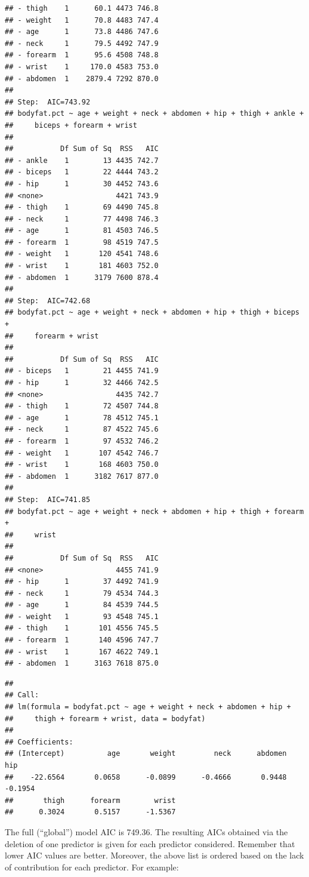 \documentclass[
]{book}
\begin{document}
\begin{verbatim}
## - thigh    1      60.1 4473 746.8
## - weight   1      70.8 4483 747.4
## - age      1      73.8 4486 747.6
## - neck     1      79.5 4492 747.9
## - forearm  1      95.6 4508 748.8
## - wrist    1     170.0 4583 753.0
## - abdomen  1    2879.4 7292 870.0
## 
## Step:  AIC=743.92
## bodyfat.pct ~ age + weight + neck + abdomen + hip + thigh + ankle + 
##     biceps + forearm + wrist
## 
##           Df Sum of Sq  RSS   AIC
## - ankle    1        13 4435 742.7
## - biceps   1        22 4444 743.2
## - hip      1        30 4452 743.6
## <none>                 4421 743.9
## - thigh    1        69 4490 745.8
## - neck     1        77 4498 746.3
## - age      1        81 4503 746.5
## - forearm  1        98 4519 747.5
## - weight   1       120 4541 748.6
## - wrist    1       181 4603 752.0
## - abdomen  1      3179 7600 878.4
## 
## Step:  AIC=742.68
## bodyfat.pct ~ age + weight + neck + abdomen + hip + thigh + biceps + 
##     forearm + wrist
## 
##           Df Sum of Sq  RSS   AIC
## - biceps   1        21 4455 741.9
## - hip      1        32 4466 742.5
## <none>                 4435 742.7
## - thigh    1        72 4507 744.8
## - age      1        78 4512 745.1
## - neck     1        87 4522 745.6
## - forearm  1        97 4532 746.2
## - weight   1       107 4542 746.7
## - wrist    1       168 4603 750.0
## - abdomen  1      3182 7617 877.0
## 
## Step:  AIC=741.85
## bodyfat.pct ~ age + weight + neck + abdomen + hip + thigh + forearm + 
##     wrist
## 
##           Df Sum of Sq  RSS   AIC
## <none>                 4455 741.9
## - hip      1        37 4492 741.9
## - neck     1        79 4534 744.3
## - age      1        84 4539 744.5
## - weight   1        93 4548 745.1
## - thigh    1       101 4556 745.5
## - forearm  1       140 4596 747.7
## - wrist    1       167 4622 749.1
## - abdomen  1      3163 7618 875.0
\end{verbatim}

\begin{verbatim}
## 
## Call:
## lm(formula = bodyfat.pct ~ age + weight + neck + abdomen + hip + 
##     thigh + forearm + wrist, data = bodyfat)
## 
## Coefficients:
## (Intercept)          age       weight         neck      abdomen          hip  
##    -22.6564       0.0658      -0.0899      -0.4666       0.9448      -0.1954  
##       thigh      forearm        wrist  
##      0.3024       0.5157      -1.5367
\end{verbatim}

The full (``global'') model AIC is 749.36. The resulting AICs obtained via the deletion of one predictor is given for each predictor considered. Remember that lower AIC values are better. Moreover, the above list is ordered based on the lack of contribution for each predictor. For example:
\end{document}
